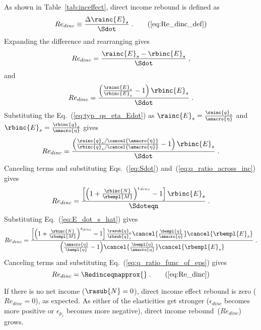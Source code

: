 As shown in Table~\ref{tab:inceffect}, direct income rebound is defined as
%
\begin{equation}
  Re_{dinc} \equiv \frac{\Delta \rainc{E}_s}{\Sdot} \; . \tag{\ref{eq:Re_dinc_def}}
\end{equation}
%
Expanding the difference and rearranging gives
%
\begin{equation}
  Re_{dinc} = \frac{\rainc{E}_s - \rbinc{E}_s}{\Sdot} \; , 
\end{equation}
%
and
%
\begin{equation}
  Re_{dinc} = \frac{\left( \frac{\rainc{E}_s}{\rbinc{E}_s} - 1  \right) \rbinc{E}_s}{\Sdot} \; .
\end{equation}
%
Substituting the Eq.~(\ref{eq:typ_qs_eta_Edot}) as
$\rainc{E}_s = \frac{\rainc{q}_s}{\amacro{\eta}}$ and  
$\rbinc{E}_s = \frac{\rbinc{q}_s}{\amacro{\eta}}$ gives
%
\begin{equation}
  Re_{dinc} = \frac{\left( \frac{\rainc{q}_s / \cancel{\amacro{\eta}}}{\rbinc{q}_s / \cancel{\amacro{\eta}}} - 1  \right) \rbinc{E}_s} 
              {\Sdot} \; .
\end{equation}
%
Canceling terms and substituting Eqs.~(\ref{eq:Sdot}) and~(\ref{eq:q_ratio_across_inc}) gives
%
\begin{equation}
  Re_{dinc} = \frac{\left[ \left( 1 + \frac{\rbinc{N}}{\rbempl{M}} \right) ^{\epsilon_{dinc}} - 1  \right] \rbinc{E}_s} 
              {\Sdoteqn} \; .
\end{equation}
%
Substituting Eq.~(\ref{eq:E_dot_s_hat}) gives
%
\begin{equation}
  Re_{dinc} = \frac{\left[ \left( 1 + \frac{\rbinc{N}}{\rbempl{M}} \right) ^{\epsilon_{dinc}} - 1  \right] 
                  \frac{\rasub{q}_s}{\rbsub{q}_s}
                \cancel{\frac{\bempl{\eta}}{\amacro{\eta}}}
                \cancel{\rbempl{E}_s}}
              {\left( \frac{\amacro{\eta}}{\bempl{\eta}} - 1 \right)\! \cancel{\frac{\bempl{\eta}}{\amacro{\eta}}} \cancel{\rbempl{E}_s}} \; .
\end{equation}
%
Canceling terms and substituting Eq.~(\ref{eq:q_ratio_func_of_eps}) gives
%
\begin{equation} 
  Re_{dinc} = \Redinceqnapprox{} \; . \tag{\ref{eq:Re_dinc}}
\end{equation}

If there is no net income ($\rasub{N} = 0$), 
direct income effect rebound is zero ($Re_{dinc} = 0$), as expected.
As either of the elasticities get stronger 
($\epsilon_{dinc}$ becomes more positive or $\epsilon_{p_s}$ becomes more negative), 
direct income rebound~($Re_{dinc}$) grows.

